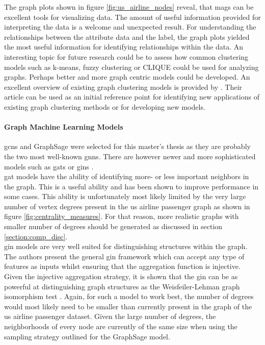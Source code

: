   \noindent The graph plots shown in figure \ref{fig:us_airline_nodes} reveal,
  that \acsp{mag} can be excellent tools for visualizing data. The
  amount of useful information provided for interpreting the data is a welcome
  and unexpected result. For understanding the relationships between the
  attribute data and the label, the graph plots yielded the most useful
  information for identifying relationships within the data. An interesting
  topic for future research could be to assess how common clustering models
  such as k-means, fuzzy clustering or CLIQUE could be used for analyzing
  graphs. Perhaps better and more graph centric models could be developed. An
  excellent overview of existing graph clustering models is provided by
  \cite{zhou2020graph}. Their article can be used as an initial reference point
  for identifying new applications of existing graph clustering methods or for 
  developing new models.

  \paragraph{Graph Machine Learning Models}\mbox{}

  \noindent \acsp{gcn} and GraphSage were selected for this master's thesis as 
  they are probably the two most well-known \acsp{gnn}. There are however 
  newer and more sophisticated models such as \acp{gat} \citep{velivckovic2018graph} 
  or \acp{gin} \citep{xu2019powerful}. \\

  \noindent \acs{gat} models have the ability of identifying more- or less 
  important neighbors in the graph. This is a useful ability and has been shown 
  to improve performance in some cases. This ability is unfortunately most likely 
  limited by the very large number of vertex degrees present in the \acs{us} 
  airline passenger graph as shown in figure \ref{fig:centrality_measures}. For 
  that reason, more realistic graphs with smaller number of degrees should be
  generated as discussed in section \ref{section:comp_disc}. \\

  \noindent \acs{gin} models are very well suited for distinguishing structures 
  within the graph. The authors \cite{xu2019powerful} present the general
  \acs{gin} framework which can accept any type of features as inputs whilst 
  ensuring that the aggregation function is injective. Given the injective 
  aggregation strategy, it is shown that the \acs{gin} can be as powerful at 
  distinguishing graph structures as the Weisfeiler-Lehman graph isomorphism test 
  \citep{weisfeiler1968}. Again, for such a model to work best, the number of
  degrees would most likely need to be smaller than currently present in the
  graph of the \acs{us} airline passenger dataset. Given the large number of 
  degrees, the neighborhoods of every node are currently of the same size when 
  using the sampling strategy outlined for the GraphSage model. \\

